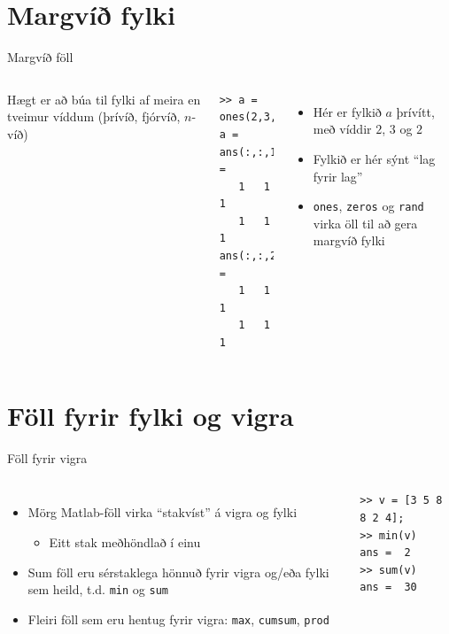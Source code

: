 \documentclass[handout]{beamer}
\begin{document}
\section{Margvíð fylki}

\begin{frame}[fragile]{Margvíð föll}
\begin{columns}
Hægt er að búa til fylki af meira en tveimur víddum (þrívíð, fjórvíð, $n$-víð)
\begin{verbatim}
>> a = ones(2,3,2)
a =
ans(:,:,1) =
   1   1   1
   1   1   1
ans(:,:,2) =
   1   1   1
   1   1   1
\end{verbatim}
\begin{itemize}
 \item Hér er fylkið $a$ þrívítt, með víddir $2$, $3$ og $2$
 \item Fylkið er hér sýnt ``lag fyrir lag''
 \item \texttt{ones}, \texttt{zeros} og \texttt{rand} virka öll til að gera margvíð fylki
\end{itemize}
\end{columns}
\end{frame}

\section{Föll fyrir fylki og vigra}

\begin{frame}[fragile]{Föll fyrir vigra}
\begin{columns}
\begin{itemize}
 \item Mörg Matlab-föll virka ``stakvíst'' á vigra og fylki
 \begin{itemize}
  \item Eitt stak meðhöndlað í einu
 \end{itemize}
 \item Sum föll eru sérstaklega hönnuð fyrir vigra og/eða fylki sem heild, t.d. \texttt{min} og \texttt{sum}
 \item Fleiri föll sem eru hentug fyrir vigra: \texttt{max}, \texttt{cumsum}, \texttt{prod}
\end{itemize}
\begin{verbatim}
>> v = [3 5 8 8 2 4];
>> min(v)
ans =  2
>> sum(v)
ans =  30
\end{verbatim}
\end{columns}
\end{frame}
\end{document}
